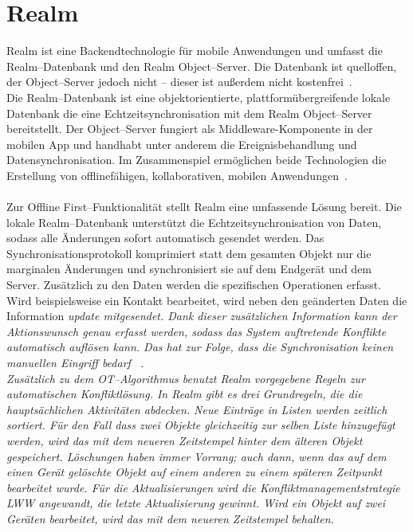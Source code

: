 \section{\label{sub:realm}Realm}
Realm ist eine Backendtechnologie für mobile Anwendungen und umfasst die Realm--Datenbank und den Realm Object--Server.
Die Datenbank ist quelloffen, der Object--Server jedoch nicht -- dieser ist außerdem nicht kostenfrei~\cite{realm}.\\
Die Realm--Datenbank ist eine objektorientierte, plattformübergreifende lokale Datenbank die eine Echtzeitsynchronisation mit dem Realm Object--Server bereitstellt.
Der Object--Server fungiert als \gls{Middleware}-Komponente in der mobilen \gls{App} und handhabt unter anderem die Ereignisbehandlung und Datensynchronisation.
Im Zusammenspiel ermöglichen beide Technologien die Erstellung von offlinefähigen, kollaborativen, mobilen Anwendungen~\cite{realm_whitepaper}.\\\\
%
%
Zur Offline First--Funktionalität stellt Realm eine umfassende Lösung bereit.
Die lokale Realm--Datenbank unterstützt die Echtzeitsynchronisation von Daten, sodass alle Änderungen sofort automatisch gesendet werden.
Das Synchronisationsprotokoll komprimiert statt dem gesamten Objekt nur die marginalen Änderungen und synchronisiert sie auf dem Endgerät und dem Server.
Zusätzlich zu den Daten werden die spezifischen Operationen erfasst. 
Wird beispielsweise ein Kontakt bearbeitet, wird neben den geänderten Daten die Information \it{update} mitgesendet.
Dank dieser zusätzlichen Information kann der Aktionswunsch genau erfasst werden, sodass das System auftretende Konflikte automatisch auflösen kann.
Das hat zur Folge, dass die Synchronisation keinen manuellen Eingriff bedarf ~\cite{realm_offline_whitepaper}.\\
%
Zusätzlich zu dem \gls{OT}--Algorithmus benutzt Realm vorgegebene Regeln zur automatischen Konfliktlösung.
In Realm gibt es drei Grundregeln, die die hauptsächlichen Aktivitäten abdecken.
Neue Einträge in Listen werden zeitlich sortiert. Für den Fall dass zwei Objekte gleichzeitig zur selben Liste hinzugefügt werden, wird das mit dem neueren Zeitstempel hinter dem älteren Objekt gespeichert.
Löschungen haben immer Vorrang; auch dann, wenn das auf dem einen Gerät gelöschte Objekt auf einem anderen zu einem späteren Zeitpunkt bearbeitet wurde.
Für die Aktualisierungen wird die Konfliktmanagementstrategie \gls{LWW} angewandt, die letzte Aktualisierung gewinnt.
Wird ein Objekt auf zwei Geräten bearbeitet, wird das mit dem neueren Zeitstempel behalten.\\ 

